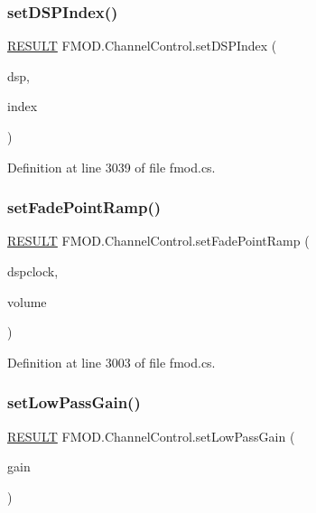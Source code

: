 \subsubsection{\texorpdfstring{set\+D\+S\+P\+Index()}{setDSPIndex()}}
{\footnotesize\ttfamily \hyperlink{namespace_f_m_o_d_a305d1176ef3f8c8815861a60407ac33d}{R\+E\+S\+U\+LT} F\+M\+O\+D.\+Channel\+Control.\+set\+D\+S\+P\+Index (\begin{DoxyParamCaption}\item[{\hyperlink{class_f_m_o_d_1_1_d_s_p}{D\+SP}}]{dsp,  }\item[{int}]{index }\end{DoxyParamCaption})}



Definition at line 3039 of file fmod.\+cs.

\mbox{\label{class_f_m_o_d_1_1_channel_control_a9359423a1a32ea9217c5e7c7f12c1a0d}} 
\subsubsection{\texorpdfstring{set\+Fade\+Point\+Ramp()}{setFadePointRamp()}}
{\footnotesize\ttfamily \hyperlink{namespace_f_m_o_d_a305d1176ef3f8c8815861a60407ac33d}{R\+E\+S\+U\+LT} F\+M\+O\+D.\+Channel\+Control.\+set\+Fade\+Point\+Ramp (\begin{DoxyParamCaption}\item[{ulong}]{dspclock,  }\item[{float}]{volume }\end{DoxyParamCaption})}



Definition at line 3003 of file fmod.\+cs.

\mbox{\label{class_f_m_o_d_1_1_channel_control_ad34908554d7cc6ffbefef37d0326b5ca}} 
\subsubsection{\texorpdfstring{set\+Low\+Pass\+Gain()}{setLowPassGain()}}
{\footnotesize\ttfamily \hyperlink{namespace_f_m_o_d_a305d1176ef3f8c8815861a60407ac33d}{R\+E\+S\+U\+LT} F\+M\+O\+D.\+Channel\+Control.\+set\+Low\+Pass\+Gain (\begin{DoxyParamCaption}\item[{float}]{gain }\end{DoxyParamCaption})}



